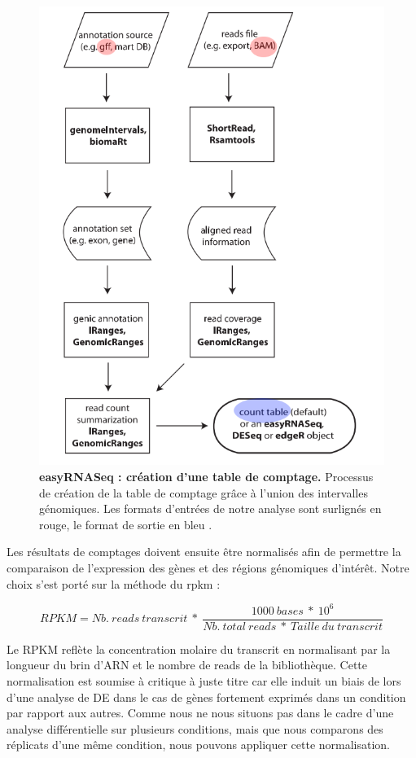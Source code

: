\documentclass[12pt,a4paper]{report}
\begin{document}
\begin{onehalfspace}
\begin{figure}[ht]
\centerline{\includegraphics[scale=0.3]{figures/easyRNASeq.png}}
\caption{\textbf{easyRNASeq : création d'une table de comptage.} Processus de création de la table de comptage grâce à l'union des intervalles génomiques. Les formats d'entrées de notre analyse sont surlignés en rouge, le format de sortie en bleu \citep{Delhomme2012}.}
\label{fig:easyRNAseq} 
\end{figure}

Les résultats de comptages doivent ensuite être normalisés afin de permettre la comparaison de l'expression des gènes et des régions génomiques d'intérêt. Notre choix s'est porté sur la méthode du \gls{rpkm} \citep{Mortazavi2008} :

\[RPKM = Nb.~reads~transcrit~*~\frac{1000~bases~*~10^6}{Nb.~total~reads~*~Taille~du~transcrit}\]

Le RPKM reflète la concentration molaire du transcrit en normalisant par la longueur du brin d'ARN et le nombre de reads de la bibliothèque. Cette normalisation est soumise à critique à juste titre \citep{Dillies2013} car elle induit un biais de lors d'une analyse de DE dans le cas de gènes fortement exprimés dans un condition par rapport aux autres. Comme nous ne nous situons pas dans le cadre d'une analyse différentielle sur plusieurs conditions, mais que nous comparons des réplicats d'une même condition, nous pouvons appliquer cette normalisation.


\end{onehalfspace}
\end{document}
